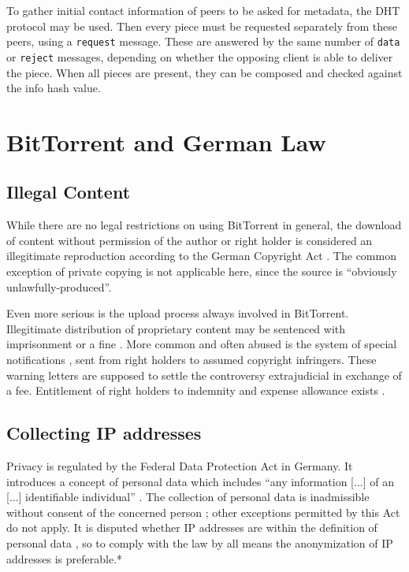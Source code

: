 \documentclass[10pt, a4paper, twoside, headsepline]{scrbook}
\renewcommand{\_}{\origunderscore\allowbreak}
\begin{document}
To gather initial contact information of peers to be asked for metadata, the DHT protocol may be used. Then every piece must be requested separately from these peers, using a \texttt{request} message. These are answered by the same number of \texttt{data} or \texttt{reject} messages, depending on whether the opposing client is able to deliver the piece. When all pieces are present, they can be composed and checked against the info hash value.

\section{BitTorrent and German Law}
\subsection{Illegal Content}
While there are no legal restrictions on using BitTorrent in general, the download of content without permission of the author or right holder is considered an illegitimate reproduction according to the German Copyright Act \cite[art.~15\,(1),~16]{urhg}. The common exception of private copying \cite[art.~53]{urhg} is not applicable here, since the source is ``obviously unlawfully-produced''.

Even more serious is the upload process always involved in BitTorrent. Illegitimate distribution of proprietary content may be sentenced with imprisonment or a fine \cite[art.~106]{urhg}. More common and often abused \cite{abmahnung} is the system of special notifications \cite[art.~97a]{urhg}, sent from right holders to assumed copyright infringers. These warning letters are supposed to settle the controversy extrajudicial in exchange of a fee. Entitlement of right holders to indemnity and expense allowance exists \cite[art.~97]{urhg}.

\subsection{Collecting IP addresses}
Privacy is regulated by the Federal Data Protection Act \cite{bdsg} in Germany. It introduces a concept of personal data which includes ``any information [...] of an [...] identifiable individual'' \cite[sec.~3\,(1)]{bdsg}. The collection of personal data is inadmissible without consent of the concerned person \cite[sec.~4]{bdsg}; other exceptions permitted by this Act do not apply. It is disputed whether IP addresses are within the definition of personal data \cite{ip}, so to comply with the law by all means the anonymization of IP addresses is preferable.*
\end{document}
